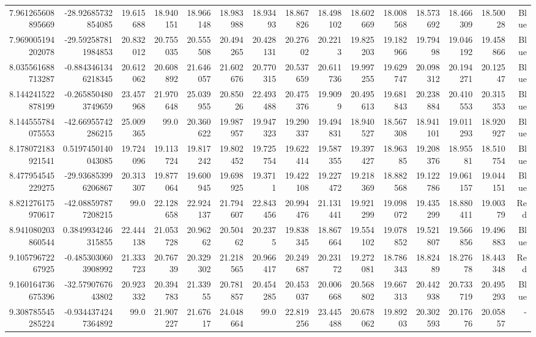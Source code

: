 \begin{center}
\begin{longtable}{rrrrrrrrrrrrrrr}
7.961265608895669 & -28.92685732854085 & 19.615688 & 18.940151 & 18.966148 & 18.983988 & 18.93493 & 18.867826 & 18.498102 & 18.602669 & 18.008568 & 18.573692 & 18.466309 & 18.50028 & Blue \\
7.969005194202078 & -29.592587811984853 & 20.832012 & 20.755035 & 20.555508 & 20.494265 & 20.428131 & 20.27602 & 20.2213 & 19.825203 & 19.182966 & 19.79498 & 19.046192 & 19.458866 & Blue \\
8.035561688713287 & -0.8843461346218345 & 20.612062 & 20.608892 & 21.646057 & 21.602676 & 20.770315 & 20.537659 & 20.611736 & 19.997255 & 19.629747 & 20.098312 & 20.194271 & 20.12547 & Blue \\
8.144241522878199 & -0.2658504803749659 & 23.457968 & 21.970648 & 25.039955 & 20.85026 & 22.493488 & 20.475376 & 19.9099 & 20.495613 & 19.681843 & 20.238884 & 20.410553 & 20.315353 & Blue \\
8.144555784075553 & -42.66955742286215 & 25.009365 & 99.0 & 20.360622 & 19.987957 & 19.947323 & 19.290337 & 19.494831 & 18.940527 & 18.567308 & 18.941101 & 19.011293 & 18.920927 & Blue \\
8.178072183921541 & 0.5197450140043085 & 19.724096 & 19.113724 & 19.817242 & 19.802452 & 19.725754 & 19.622414 & 19.587355 & 19.397427 & 18.96385 & 19.208376 & 18.95581 & 18.510754 & Blue \\
8.477954545229275 & -29.936853996206867 & 20.313307 & 19.877064 & 19.600945 & 19.698925 & 19.3711 & 19.422108 & 19.227472 & 19.218369 & 18.882568 & 19.122786 & 19.061157 & 19.044151 & Blue \\
8.821276175970617 & -42.088597877208215 & 99.0 & 22.128658 & 22.924137 & 21.794607 & 22.843456 & 20.994476 & 21.131441 & 19.921299 & 19.098072 & 19.435299 & 18.880411 & 19.00379 & Red \\
8.941080203860544 & 0.3849934246315855 & 22.444138 & 21.053728 & 20.96262 & 20.50462 & 20.2375 & 19.838345 & 18.867664 & 19.554102 & 19.078852 & 19.521807 & 19.566856 & 19.496883 & Blue \\
9.10579672267925 & -0.4853030603908992 & 21.333723 & 20.76739 & 20.329302 & 21.218565 & 20.966417 & 20.249687 & 20.23172 & 19.272081 & 18.786343 & 18.82489 & 18.27678 & 18.443348 & Red \\
9.160164736675396 & -32.5790767643802 & 20.923332 & 20.394783 & 21.33955 & 20.781857 & 20.454285 & 20.453037 & 20.006668 & 20.568802 & 19.667313 & 20.442938 & 20.733719 & 20.495293 & Blue \\
9.308785545285224 & -0.9344374247364892 & 99.0 & 21.907227 & 21.67617 & 24.048664 & 99.0 & 22.819256 & 23.445488 & 20.678062 & 19.89203 & 20.302593 & 20.17676 & 20.05857 & - \\

\end{longtable}
\end{center}

